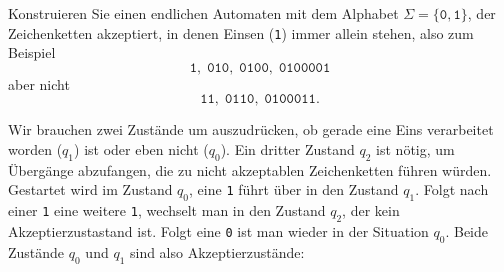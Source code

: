 Konstruieren Sie einen endlichen Automaten mit dem Alphabet
$\Sigma=\{\texttt{0},\texttt{1}\}$, der Zeichenketten akzeptiert, in denen
Einsen (\texttt{1}) immer allein stehen, also zum Beispiel
\[
\texttt{1},\;
\texttt{010},\;
\texttt{0100},\;
\texttt{0100001}
\]
aber nicht
\[
\texttt{11},\;
\texttt{0110},\;
\texttt{0100011}.
\]

\begin{loesung}
Wir brauchen zwei Zustände um auszudrücken, ob gerade eine Eins verarbeitet
worden ($q_1$) ist oder eben nicht ($q_0$).
Ein dritter Zustand $q_2$ ist nötig, um Übergänge abzufangen, die zu nicht
akzeptablen Zeichenketten führen würden.
Gestartet wird im Zustand $q_0$, eine \texttt{1} führt über in den 
Zustand $q_1$.
Folgt nach einer \texttt{1} eine weitere \texttt{1}, wechselt man
in den Zustand $q_2$, der kein Akzeptierzustastand ist.
Folgt eine \texttt{0} ist man wieder in der Situation $q_0$.
Beide Zustände $q_0$ und $q_1$ sind also Akzeptierzustände:
\begin{center}
\def\zustand#1#2{
	\fill[color=white] #1 circle[radius=0.5];
	\node at #1 {$#2$};
	\draw #1 circle[radius=0.5];
}
\def\akzeptierzustand#1#2{
	\fill[color=white] #1 circle[radius=0.5];
	\node at #1 {$#2$};
	\draw #1 circle[radius=0.5];
	\draw #1 circle[radius=0.45];
}
\def\pfeil#1#2#3{
	\draw[->,shorten >= 0.5cm,shorten <= 0.5cm] #1 -- #2;
	\node at ($0.5*#1+0.5*#2$) [above] {$#3$};
}
\end{center}
\end{loesung}

